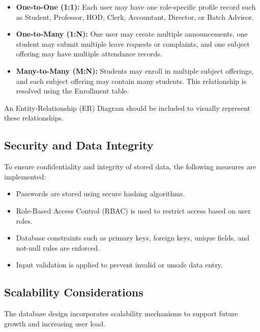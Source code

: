 \begin{itemize}
    \item \textbf{One-to-One (1:1):} Each user may have one role-specific profile record such as Student, Professor, HOD, Clerk, Accountant, Director, or Batch Advisor.
    \item \textbf{One-to-Many (1:N):} One user may create multiple announcements, one student may submit multiple leave requests or complaints, and one subject offering may have multiple attendance records.
    \item \textbf{Many-to-Many (M:N):} Students may enroll in multiple subject offerings, and each subject offering may contain many students. This relationship is resolved using the Enrollment table.
\end{itemize}

An Entity-Relationship (ER) Diagram should be included to visually represent these relationships.

\subsection{Security and Data Integrity}

To ensure confidentiality and integrity of stored data, the following measures are implemented:

\begin{itemize}
    \item Passwords are stored using secure hashing algorithms.
    \item Role-Based Access Control (RBAC) is used to restrict access based on user roles.
    \item Database constraints such as primary keys, foreign keys, unique fields, and not-null rules are enforced.
    \item Input validation is applied to prevent invalid or unsafe data entry.
\end{itemize}


\subsection{Scalability Considerations}

The database design incorporates scalability mechanisms to support future growth and increasing user load.

